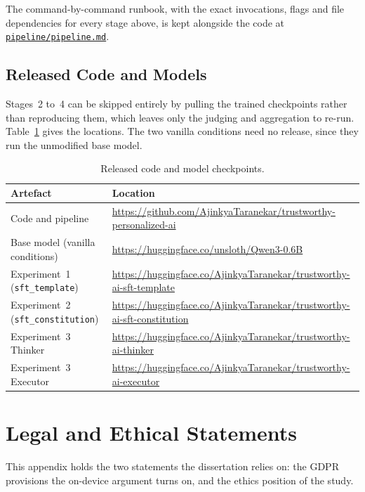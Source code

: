 The command-by-command runbook, with the exact invocations, flags and file dependencies for every stage above, is kept alongside the code at \href{https://github.com/AjinkyaTaranekar/trustworthy-personalized-ai/blob/main/pipeline/pipeline.md}{\texttt{pipeline/pipeline.md}}.

\section*{Released Code and Models}

Stages~2 to~4 can be skipped entirely by pulling the trained checkpoints rather than reproducing them, which leaves only the judging and aggregation to re-run. Table~\ref{tab:released-artefacts} gives the locations. The two vanilla conditions need no release, since they run the unmodified base model.

\begin{table}[htbp]
  \centering\small
  \caption{Released code and model checkpoints.}
  \label{tab:released-artefacts}
  \begin{tabular}{@{}l p{9.1cm}@{}}
    \toprule
    Artefact & Location \\
    \midrule
    Code and pipeline & \url{https://github.com/AjinkyaTaranekar/trustworthy-personalized-ai} \\
    Base model (vanilla conditions) & \url{https://huggingface.co/unsloth/Qwen3-0.6B} \\
    Experiment~1 (\texttt{sft\_template}) & \url{https://huggingface.co/AjinkyaTaranekar/trustworthy-ai-sft-template} \\
    Experiment~2 (\texttt{sft\_constitution}) & \url{https://huggingface.co/AjinkyaTaranekar/trustworthy-ai-sft-constitution} \\
    Experiment~3 Thinker & \url{https://huggingface.co/AjinkyaTaranekar/trustworthy-ai-thinker} \\
    Experiment~3 Executor & \url{https://huggingface.co/AjinkyaTaranekar/trustworthy-ai-executor} \\
    \bottomrule
  \end{tabular}
\end{table}

\chapter{Legal and Ethical Statements}
\label{chap:gdpr-articles}

This appendix holds the two statements the dissertation relies on: the GDPR provisions the on-device argument turns on, and the ethics position of the study.

